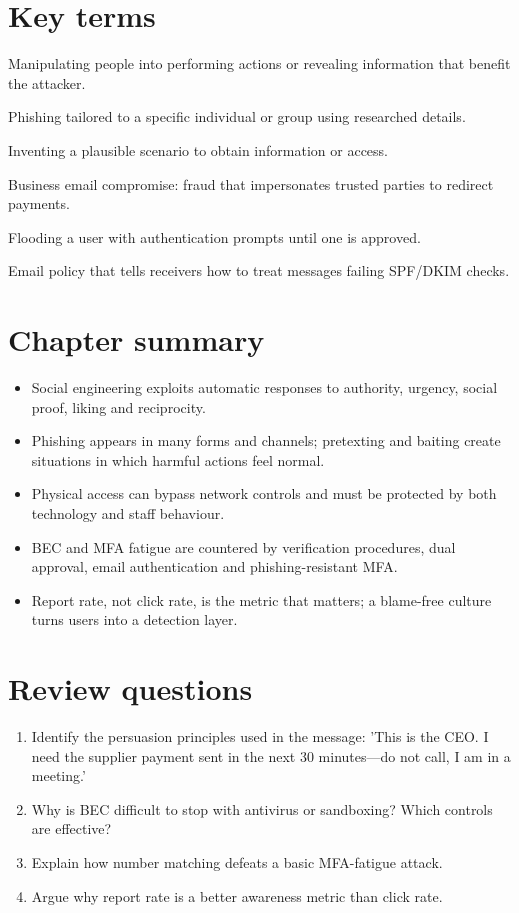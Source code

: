 \section*{Key terms}
\begin{description}[style=nextline,leftmargin=1.2em]
  \item[Social engineering] Manipulating people into performing actions or revealing information that benefit the attacker.
  \item[Spear-phishing] Phishing tailored to a specific individual or group using researched details.
  \item[Pretexting] Inventing a plausible scenario to obtain information or access.
  \item[BEC] Business email compromise: fraud that impersonates trusted parties to redirect payments.
  \item[MFA fatigue] Flooding a user with authentication prompts until one is approved.
  \item[DMARC] Email policy that tells receivers how to treat messages failing SPF/DKIM checks.
\end{description}

\section*{Chapter summary}
\begin{itemize}
  \item Social engineering exploits automatic responses to authority, urgency, social proof, liking and reciprocity.
  \item Phishing appears in many forms and channels; pretexting and baiting create situations in which harmful actions feel normal.
  \item Physical access can bypass network controls and must be protected by both technology and staff behaviour.
  \item BEC and MFA fatigue are countered by verification procedures, dual approval, email authentication and phishing-resistant MFA.
  \item Report rate, not click rate, is the metric that matters; a blame-free culture turns users into a detection layer.
\end{itemize}

\section*{Review questions}
\begin{enumerate}
  \item Identify the persuasion principles used in the message: 'This is the CEO. I need the supplier payment sent in the next 30 minutes—do not call, I am in a meeting.'
  \item Why is BEC difficult to stop with antivirus or sandboxing? Which controls are effective?
  \item Explain how number matching defeats a basic MFA-fatigue attack.
  \item Argue why report rate is a better awareness metric than click rate.
\end{enumerate}
